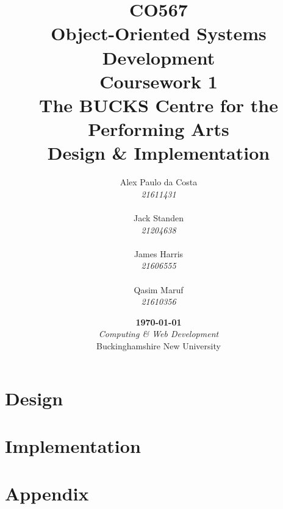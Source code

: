 \documentclass{report}
\title{
    \fontspec[Path=.fonts/]{LibertineDisplay}
    \Large CO567\\
    Object-Oriented Systems Development\\
    Coursework 1\vspace*{.65cm}\\
    \huge The BUCKS Centre for the Performing Arts\\
    Design \& Implementation\vfill
}
\author{
    Alex Paulo da Costa\\
    \textit{21611431}\\
    \hfill\\
    Jack Standen\\
    \textit{21204638}\\
    \hfill\\
    James Harris\\
    \textit{21606555}\\
    \hfill\\
    Qasim Maruf\\
    \textit{21610356}
}
\date{
    \vfill\textbf{\today}\\
    \vspace*{.75cm}\textit{Computing \& Web Development}\\
    Buckinghamshire New University
}
\begin{document}
    \maketitle
    \tableofcontents

    \part{Design}
    
    
    
    

    \part{Implementation}
    
    
    
    
    

    \part{Appendix}
    
\end{document}
